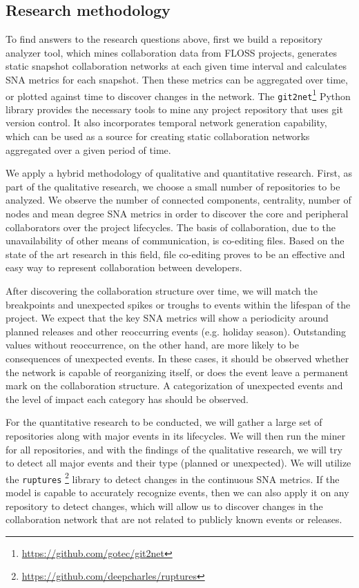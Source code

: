 \subsection{Research methodology}
To find answers to the research questions above, first we build a repository analyzer tool, which mines collaboration data from FLOSS projects, generates static snapshot collaboration networks at each given time interval and calculates SNA metrics for each snapshot. Then these metrics can be aggregated over time, or plotted against time to discover changes in the network. The \texttt{git2net}\footnote{\url{https://github.com/gotec/git2net}} \cite{goteAnalysingTimeStampedCoEditing2019} Python library provides the necessary tools to mine any project repository that uses git version control. It also incorporates temporal network generation capability, which can be used as a source for creating static collaboration networks aggregated over a given period of time.


We apply a hybrid methodology of qualitative and quantitative research. First, as part of the qualitative research, we choose a small number of repositories to be analyzed. We observe the number of connected components, centrality, number of nodes and mean degree SNA metrics in order to discover the core and peripheral collaborators over the project lifecycles. The basis of collaboration, due to the unavailability of other means of communication, is co-editing files. Based on the state of the art research in this field, file co-editing proves to be an effective and easy way to represent collaboration between developers.

After discovering the collaboration structure over time, we will match the breakpoints and unexpected spikes or troughs to events within the lifespan of the project. We expect that the key SNA metrics will show a periodicity around planned releases and other reoccurring events (e.g. holiday season). Outstanding values without reoccurrence, on the other hand, are more likely to be consequences of unexpected events. In these cases, it should be observed whether the network is capable of reorganizing itself, or does the event leave a permanent mark on the collaboration structure. A categorization of unexpected events and the level of impact each category has should be observed.

For the quantitative research to be conducted, we will gather a large set of repositories along with major events in its lifecycles. We will then run the miner for all repositories, and with the findings of the qualitative research, we will try to detect all major events and their type (planned or unexpected). We will utilize the \texttt{ruptures} \footnote{\url{https://github.com/deepcharles/ruptures}} library to detect changes in the continuous SNA metrics. If the model is capable to accurately recognize events, then we can also apply it on any repository to detect changes, which will allow us to discover changes in the collaboration network that are not related to publicly known events or releases.

